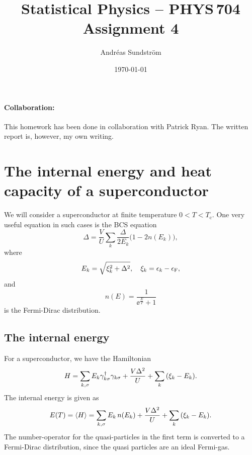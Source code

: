 \documentclass[11pt,letter, swedish, english
]{article}
\newcommand{\Tc}{\ensuremath{T_{\text{c}}}}
\newcommand{\eF}{\ensuremath{\epsilon_{\text{F}}}}
\begin{document}




\title{Statistical Physics -- PHYS\,704 \\
Assignment 4}
\author{Andréas Sundström}
\date{\today}

\maketitle

\paragraph{Collaboration: } 
This homework has been done in collaboration with Patrick Ryan. The
written report is, however, my own writing. 

\section{The internal energy and heat capacity of a superconductor}
We will consider a superconductor at finite temperature $0<T<\Tc$. One
very useful equation in such cases is the BCS equation
\begin{equation}\label{eq:BCS}
\Delta=\frac{V}{U}\sum_k \frac{\Delta}{2E_k}\Big(1-2n(E_k)\Big),
\end{equation}
where
\begin{equation}
E_k=\sqrt{\xi_k^2+\Delta^2}\qcomma \xi_k=\epsilon_k-\eF,
\end{equation}
and
\begin{equation}\label{eq:nFD}
n(E)=\frac{1}{\ee^{\frac{E}{T}}+1}
\end{equation}
is the Fermi-Dirac distribution.

\subsection{The internal energy}
For a superconductor, we have the Hamiltonian
\begin{equation}
H=\sum_{k, \sigma} E_k\gamma_{k \sigma}^\dagger\gamma_{k \sigma}
+\frac{V\Delta^2}{U}+\sum_k\qty(\xi_k-E_k).
\end{equation}
The internal energy is given as
\begin{equation}\label{eq:1a_E0}
E(T)=\ev{H}=
\sum_{k, \sigma} E_k\,n(E_k)
+\frac{V\Delta^2}{U}+\sum_k\qty(\xi_k-E_k).
\end{equation}
The number-operator for the quasi-particles in the first term is
converted to a Fermi-Dirac distribution, since the quasi particles are
an ideal Fermi-gas. 
\end{document}
